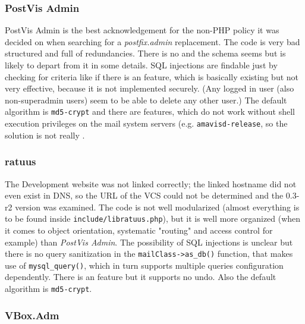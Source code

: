 \documentclass[12pt,a4paper]{scrartcl}
\begin{document}
			\subsubsection{PostVis Admin}

				PostVis Admin is the best acknowledgement for the non-PHP
				policy it was decided on when searching for a
				\emph{postfix.admin} replacement. The code is very bad
				structured and full of redundancies. There is no  and the schema seems  but is likely to depart from it in
				some details. \ac{SQL} injections are findable just by checking
				for criteria like if there is an 
				feature, which is basically existing but not very effective,
				because it is not implemented securely. (Any logged in user
				(also non-superadmin users) seem to be able to delete any other
				user.) The default  algorithm is
				\texttt{md5-crypt} and there are features, which do not work
				without shell execution privileges on the mail system servers
				(e.g. \texttt{amavisd-release}, so the solution is not really
				.

			\subsubsection{ratuus}

				The Development website was not linked correctly; the linked
				hostname did not even exist in DNS, so the URL of the \ac{VCS}
				could not be determined and the 0.3-r2 version was examined.
				The code is not well modularized (almost everything is to be
				found inside \texttt{include/libratuus.php}), but it is well
				more organized (when it comes to object orientation, systematic
				"routing" and access control for example) than \emph{PostVis
				Admin}. The possibility of \ac{SQL} injections is unclear but
				there is no query sanitization in the
				\texttt{mailClass->as\_db()} function, that makes use of
				\texttt{mysql\_query()}, which in turn supports multiple
				queries configuration dependently. There is an  feature but it supports no undo. Also the default
				 algorithm is \texttt{md5-crypt}.

			\subsubsection{VBox.Adm}
\end{document}
